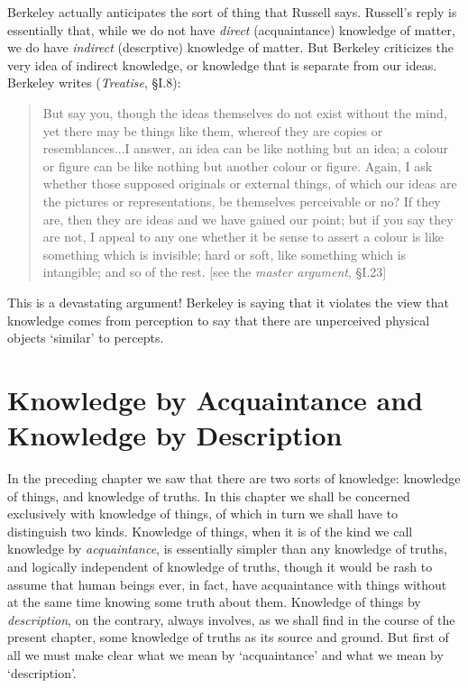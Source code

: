 \documentclass[oneside,letterpaper,12pt]{book}
\begin{document}
Berkeley actually anticipates the sort of thing that Russell says. Russell's reply is essentially that, while we do not have \textit{direct} (acquaintance) knowledge of matter, we do have \textit{indirect} (descrptive) knowledge of matter. But Berkeley criticizes the very idea of indirect knowledge, or knowledge that is separate from our ideas. Berkeley writes (\textit{Treatise}, \S I.8):
\begin{quote}
	But say you, though the ideas themselves do not exist without the mind, yet there may be things like them, whereof they are copies or resemblances...I answer, an idea can be like nothing but an idea; a colour or figure can be like nothing but another colour or figure. Again, I ask whether those supposed originals or external things, of which our ideas are the pictures or representations, be themselves perceivable or no? If they are, then they are ideas and we have gained our point; but if you say they are not, I appeal to any one whether it be sense to assert a colour is like something which is invisible; hard or soft, like something which is intangible; and so of the rest. [see the \textit{master argument}, \S I.23]
\end{quote}
This is a devastating argument! Berkeley is saying that it violates the view that knowledge comes from perception to say that there are unperceived physical objects `similar' to percepts. %

\hypertarget{chapter-v.-knowledge-by-acquaintance-and-knowledge-by-description}{%
\chapter{Knowledge by Acquaintance and Knowledge by Description}\label{chapter-v.-knowledge-by-acquaintance-and-knowledge-by-description}}


In the preceding chapter we saw that there are two sorts of knowledge:
knowledge of things, and knowledge of truths. In this chapter we shall
be concerned exclusively with knowledge of things, of which in turn we
shall have to distinguish two kinds. Knowledge of things, when it is of
the kind we call knowledge by \emph{acquaintance}, is essentially
simpler than any knowledge of truths, and logically independent of
knowledge of truths, though it would be rash to assume that human beings
ever, in fact, have acquaintance with things without at the same time
knowing some truth about them. Knowledge of things by
\emph{description}, on the contrary, always involves, as we shall find
in the course of the present chapter, some knowledge of truths as its
source and ground. But first of all we must make clear what we mean by
`acquaintance' and what we mean by
`description'.
\end{document}

